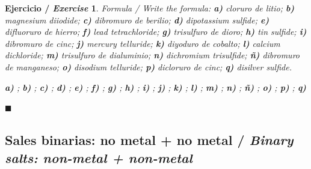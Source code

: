 \documentclass[12pt]{article}
\theoremstyle{mygreennumbox}
\newtheorem{ejercicioT}{Ejercicio / \textit{Exercise}}[section]
\newenvironment{exercise}{\begin{eBoxmygreen}\begin{ejercicioT}}{\hfill{\color{mygreen}\tiny\ensuremath{\blacksquare}}\end{ejercicioT}\end{eBoxmygreen}}
\newcommand{\en}[1]{\textit{#1}}
\begin{document}
\begin{exercise}
    Formula / \en{Write the formula}: \textbf{a)} cloruro de litio; \textbf{b)} \en{magnesium diiodide}; \textbf{c)} dibromuro de berilio; \textbf{d)} \en{dipotassium sulfide}; \textbf{e)} difluoruro de hierro; \textbf{f)} \en{lead tetrachloride}; \textbf{g)} trisulfuro de dioro; \textbf{h)} \en{tin sulfide}; \textbf{i)} dibromuro de cinc; \textbf{j)} \en{mercury telluride}; \textbf{k)} diyoduro de cobalto; \textbf{l)} \en{calcium dichloride}; \textbf{m)} trisulfuro de dialuminio; \textbf{n)} \en{dichromium trisulfide}; \textbf{ñ)} dibromuro de manganeso; \textbf{o)} \en{disodium telluride}; \textbf{p)} dicloruro de cinc; \textbf{q)} \en{disilver sulfide}.
    \begin{solu}
        \textbf{a)} \textcolor{red}{}; \textbf{b)} \textcolor{red}{}; \textbf{c)} \textcolor{red}{}; \textbf{d)} \textcolor{red}{}; \textbf{e)} \textcolor{red}{}; \textbf{f)} \textcolor{red}{}; \textbf{g)} \textcolor{red}{}; \textbf{h)} \textcolor{red}{}; \textbf{i)} \textcolor{red}{}; \textbf{j)} \textcolor{red}{}; \textbf{k)} \textcolor{red}{}; \textbf{l)} \textcolor{red}{}; \textbf{m)} \textcolor{red}{}; \textbf{n)} \textcolor{red}{}; \textbf{ñ)} \textcolor{red}{}; \textbf{o)} \textcolor{red}{}; \textbf{p)} \textcolor{red}{}; \textbf{q)} \textcolor{red}{}
    \end{solu}
\end{exercise}

\subsection{Sales binarias: no metal + no metal / \en{Binary salts: non-metal + non-metal}}
\end{document}
